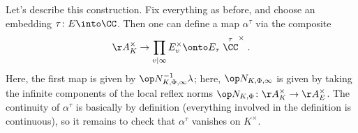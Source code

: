 \documentclass[../notes.tex]{subfiles}
\begin{document}
Let's describe this construction. Fix everything as before, and choose an embedding $\tau\colon E\into\CC$. Then one can define a map $\alpha^\tau$ via the composite
\[\AA_K^\times\to\prod_{v\mid\infty}E_v^\times\onto E_\tau\stackrel\tau\CC^\times.\]
Here, the first map is given by $\op N_{K,\Phi,\infty}^{-1}\lambda$; here, $\op N_{K,\Phi,\infty}$ is given by taking the infinite components of the local reflex norms $\op N_{K,\Phi}\colon\AA_K^\times\to\AA_E^\times$. The continuity of $\alpha^\tau$ is basically by definition (everything involved in the definition is continuous), so it remains to check that $\alpha^\tau$ vanishes on $K^\times$.
\end{document}

